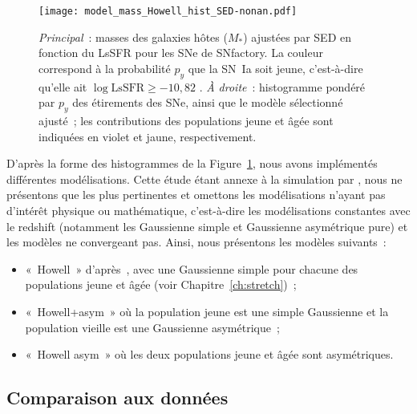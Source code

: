 \documentclass[../main/main.tex]{subfiles}
\begin{document}
\begin{figure}[t]
    \centering
    \texttt{[image: model\_mass\_Howell\_hist\_SED-nonan.pdf]}
    \caption[$M_*$ en fonction du LsSFR des SNe~Ia de SNfactory et modèle de
    masse sélectionné ajusté]{\textit{Principal}~: masses des galaxies hôtes
        ($M_*$) ajustées par SED en fonction du LsSFR pour les SNe de SNfactory.
        La couleur correspond à la probabilité $p_y$ que la SN~Ia soit jeune,
        c'est-à-dire qu'elle ait $\log \mathrm{LsSFR} \geq -10,82$
        \citep[voir][et Chapitre~\ref{ch:stretch}]{rigault2020}. \textit{À
        droite}~: histogramme pondéré par $p_y$ des étirements des SNe, ainsi
        que le modèle sélectionné ajusté~; les contributions des populations
    jeune et âgée sont indiquées en violet et jaune, respectivement.}
    \label{fig:massmodel}
\end{figure}

D'après la forme des histogrammes de la Figure~\ref{fig:massmodel}, nous avons
implémentés différentes modélisations. Cette étude étant annexe à la simulation
par \snana, nous ne présentons que les plus pertinentes et omettons les
modélisations n'ayant pas d'intérêt physique ou mathématique, c'est-à-dire les
modélisations constantes avec le redshift (notamment les Gaussienne simple et
Gaussienne asymétrique pure) et les modèles ne convergeant pas. Ainsi, nous
présentons les modèles suivants~:

\begin{itemize}
    \item «~Howell~» d'après~\cite{howell2007}, avec une Gaussienne simple pour
        chacune des populations jeune et âgée (voir Chapitre~\ref{ch:stretch})~;

    \item «~Howell+asym~» où la population jeune est une simple Gaussienne et la
        population vieille est une Gaussienne asymétrique~;

    \item «~Howell asym~» où les deux populations jeune et âgée sont
        asymétriques.
\end{itemize}

\subsection{Comparaison aux données}\label{ssec:mres}
\end{document}
